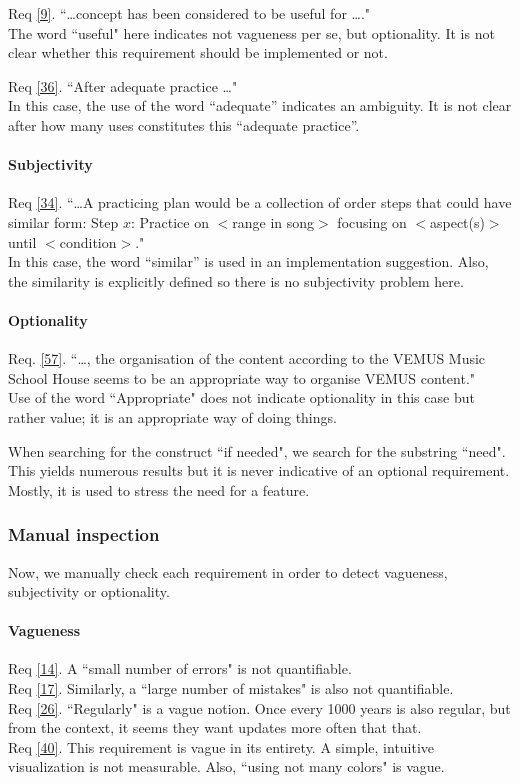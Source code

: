 \documentclass[a4paper,twoside, twocolumn,11pt]{article}
\numberwithin{equation}{section}
\begin{document}
Req \ref{9}. ``\ldots concept has been considered to be useful for \ldots."\\
The word ``useful"  here indicates not vagueness per se, but optionality. It is not clear whether this requirement should be implemented or not.

Req \ref{36}. ``After adequate practice \ldots "\\
 In this case, the use of the word ``adequate'' indicates an ambiguity. It is not clear after how many uses constitutes this ``adequate practice''.

\paragraph{Subjectivity}
Req \ref{34}. ``\ldots A practicing plan would be a collection of order steps that could have similar form: Step $x$: Practice on $<$range in song$>$ focusing on $<$aspect(s)$>$ until $<$condition$>$."\\ 
In this case, the word ``similar'' is used in an implementation suggestion. Also, the similarity is explicitly defined so there is no subjectivity problem here.

\paragraph{Optionality}
Req. \ref{57}. ``\ldots, the organisation of the content according to the VEMUS Music School House seems to be an appropriate way to organise VEMUS content." \\
Use of the word ``Appropriate" does not indicate optionality in this case but rather value; it is an appropriate way of doing things.

When searching for the construct ``if needed", we search for the substring ``need". This yields numerous results but it is never indicative of an optional requirement. Mostly, it is used to stress the need for a feature.

\subsubsection{Manual inspection}
Now, we manually check each requirement in order to detect vagueness, subjectivity or optionality.

\paragraph{Vagueness} 
Req \ref{14}. A ``small number of errors" is not quantifiable.\\
Req \ref{17}. Similarly, a ``large number of mistakes" is also not quantifiable.\\
Req \ref{26}. ``Regularly" is a vague notion. Once every 1000 years is also regular, but from the context, it seems they want updates more often that that.\\
Req \ref{40}. This requirement is vague in its entirety. A simple, intuitive visualization is not measurable. Also, ``using not many colors" is vague.
\end{document}
